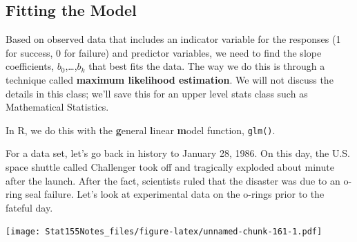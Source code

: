 \documentclass[]{book}
\newenvironment{Shaded}{\begin{snugshade}}{\end{snugshade}}
\newcommand{\DataTypeTok}[1]{\textcolor[rgb]{0.13,0.29,0.53}{#1}}
\newcommand{\KeywordTok}[1]{\textcolor[rgb]{0.13,0.29,0.53}{\textbf{#1}}}
\newcommand{\NormalTok}[1]{#1}
\newcommand{\OperatorTok}[1]{\textcolor[rgb]{0.81,0.36,0.00}{\textbf{#1}}}
\newcommand{\StringTok}[1]{\textcolor[rgb]{0.31,0.60,0.02}{#1}}
\begin{document}
\hypertarget{fitting-the-model}{%
\subsection{Fitting the Model}\label{fitting-the-model}}

Based on observed data that includes an indicator variable for the responses (1 for success, 0 for failure) and predictor variables, we need to find the slope coefficients, \(b_0\),\ldots{},\(b_k\) that best fits the data. The way we do this is through a technique called \textbf{maximum likelihood estimation}. We will not discuss the details in this class; we'll save this for an upper level stats class such as Mathematical Statistics.

In R, we do this with the \textbf{g}eneral \textbf{l}inear \textbf{m}odel function, \texttt{glm()}.

For a data set, let's go back in history to January 28, 1986. On this day, the U.S. space shuttle called Challenger took off and tragically exploded about minute after the launch. After the fact, scientists ruled that the disaster was due to an o-ring seal failure. Let's look at experimental data on the o-rings prior to the fateful day.

\begin{Shaded}
\end{Shaded}

\texttt{[image: Stat155Notes\_files/figure-latex/unnamed-chunk-161-1.pdf]}

\begin{Shaded}
\end{Shaded}
\end{document}
